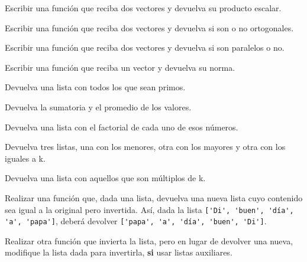 \begin{partes}
\item Escribir una función que reciba dos vectores y devuelva su producto
escalar.
\item Escribir una función que reciba dos vectores y devuelva si son o no
ortogonales.
\item Escribir una función que reciba dos vectores y devuelva si son
paralelos o no.
\item Escribir una función que reciba un vector y devuelva su norma.
\end{partes}


\begin{partes}
\item Devuelva una lista con todos los que sean primos.
\item Devuelva la sumatoria y el promedio de los valores.
\item Devuelva una lista con el factorial de cada uno de esos números.
\end{partes}


\begin{partes}
\item Devuelva tres listas, una con los menores, otra con los mayores y
otra con los iguales a k.
\item Devuelva una lista con aquellos que son múltiplos de k.
\end{partes}




\begin{partes}
\item Realizar una función que, dada una lista, devuelva una nueva lista cuyo
contenido sea igual a la original pero invertida. Así, dada la lista
\lstinline!['Di', 'buen', 'día', 'a', 'papa']!, deberá devolver
\lstinline!['papa', 'a', 'día', 'buen', 'Di']!.

\item Realizar otra función que invierta la lista, pero en lugar de devolver
una nueva, modifique la lista dada para invertirla, {\bf si}  usar listas
auxiliares. 
\end{partes}


